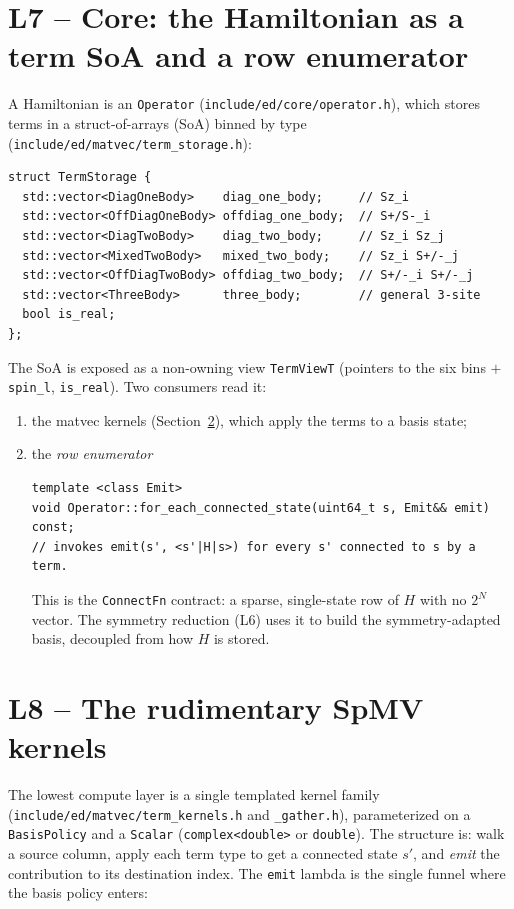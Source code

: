 \documentclass[11pt]{article}
\newcommand{\code}[1]{\texttt{\small #1}}
\newcommand{\file}[1]{\texttt{\footnotesize #1}}
\begin{document}
\section{L7 -- Core: the Hamiltonian as a term SoA and a row enumerator}

A Hamiltonian is an \code{Operator} (\file{include/ed/core/operator.h}),
which stores terms in a struct-of-arrays (SoA) binned by type
(\file{include/ed/matvec/term\_storage.h}):
\begin{lstlisting}
struct TermStorage {
  std::vector<DiagOneBody>    diag_one_body;     // Sz_i
  std::vector<OffDiagOneBody> offdiag_one_body;  // S+/S-_i
  std::vector<DiagTwoBody>    diag_two_body;     // Sz_i Sz_j
  std::vector<MixedTwoBody>   mixed_two_body;    // Sz_i S+/-_j
  std::vector<OffDiagTwoBody> offdiag_two_body;  // S+/-_i S+/-_j
  std::vector<ThreeBody>      three_body;        // general 3-site
  bool is_real;
};
\end{lstlisting}
The SoA is exposed as a non-owning view \code{TermViewT} (pointers to
the six bins $+$ \code{spin\_l}, \code{is\_real}). Two consumers read it:
\begin{enumerate}[nosep]
  \item the matvec kernels (Section~\ref{sec:kernels}), which apply the
  terms to a basis state;
  \item the \emph{row enumerator}
\begin{lstlisting}
template <class Emit>
void Operator::for_each_connected_state(uint64_t s, Emit&& emit) const;
// invokes emit(s', <s'|H|s>) for every s' connected to s by a term.
\end{lstlisting}
  This is the \code{ConnectFn} contract: a sparse, single-state row of
  $H$ with no $2^N$ vector. The symmetry reduction (L6) uses it to build
  the symmetry-adapted basis, decoupled from how $H$ is stored.
\end{enumerate}

\section{L8 -- The rudimentary SpMV kernels}
\label{sec:kernels}

The lowest compute layer is a single templated kernel family
(\file{include/ed/matvec/term\_kernels.h} and \code{\_gather.h}),
parameterized on a \code{BasisPolicy} and a \code{Scalar}
(\code{complex<double>} or \code{double}). The structure is: walk a
source column, apply each term type to get a connected state $s'$, and
\emph{emit} the contribution to its destination index. The
\code{emit} lambda is the single funnel where the basis policy enters:
\end{document}
